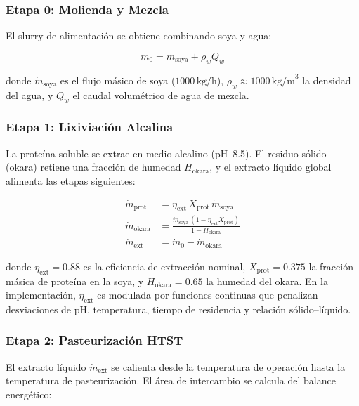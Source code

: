 \documentclass[10pt,letterpaper,twocolumn]{article}
\begin{document}
\subsubsection{Etapa 0: Molienda y Mezcla}

El slurry de alimentación se obtiene combinando soya y agua:

\begin{equation}
\dot{m}_{0} = \dot{m}_{\text{soya}} + \rho_w Q_w
\label{eq:stage0_mass}
\end{equation}

donde $\dot{m}_{\text{soya}}$ es el flujo m\'asico de soya ($1000\,\text{kg/h}$), $\rho_w \approx 1000\,\text{kg/m}^3$ la densidad del agua, y $Q_w$ el caudal volum\'etrico de agua de mezcla.

\subsubsection{Etapa 1: Lixiviaci\'on Alcalina}

La prote\'ina soluble se extrae en medio alcalino (pH~8.5). El residuo s\'olido (okara) retiene una fracci\'on de humedad $H_{\text{okara}}$, y el extracto l\'iquido global alimenta las etapas siguientes:

\begin{align}
\dot{m}_{\text{prot}} &= \eta_{\text{ext}} \, X_{\text{prot}} \, \dot{m}_{\text{soya}} \label{eq:stage1_extract} \\
\dot{m}_{\text{okara}} &= \frac{\dot{m}_{\text{soya}} \,(1 - \eta_{\text{ext}} X_{\text{prot}})}{1 - H_{\text{okara}}} \label{eq:stage1_okara} \\
\dot{m}_{\text{ext}} &= \dot{m}_0 - \dot{m}_{\text{okara}} \label{eq:stage1_extract_flow}
\end{align}

donde $\eta_{\text{ext}} = 0.88$ es la eficiencia de extracci\'on nominal, $X_{\text{prot}} = 0.375$ la fracci\'on m\'asica de prote\'ina en la soya, y $H_{\text{okara}} = 0.65$ la humedad del okara. En la implementación, $\eta_{\text{ext}}$ es modulada por funciones continuas que penalizan desviaciones de pH, temperatura, tiempo de residencia y relaci\'on s\'olido--l\'iquido.

\subsubsection{Etapa 2: Pasteurizaci\'on HTST}

El extracto l\'iquido $\dot{m}_{\text{ext}}$ se calienta desde la temperatura de operaci\'on hasta la temperatura de pasteurizaci\'on. El \'area de intercambio se calcula del balance energ\'etico:
\end{document}
